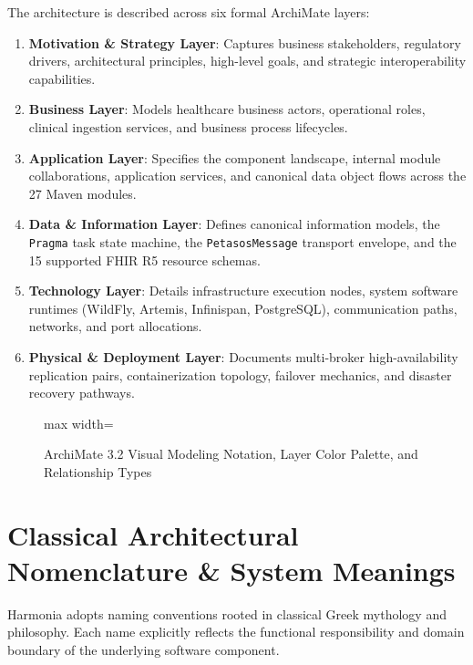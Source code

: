 The architecture is described across six formal ArchiMate layers:
\begin{enumerate}
    \item \textbf{Motivation \& Strategy Layer}: Captures business stakeholders, regulatory drivers, architectural principles, high-level goals, and strategic interoperability capabilities.
    \item \textbf{Business Layer}: Models healthcare business actors, operational roles, clinical ingestion services, and business process lifecycles.
    \item \textbf{Application Layer}: Specifies the component landscape, internal module collaborations, application services, and canonical data object flows across the 27 Maven modules.
    \item \textbf{Data \& Information Layer}: Defines canonical information models, the \texttt{Pragma} task state machine, the \texttt{PetasosMessage} transport envelope, and the 15 supported FHIR R5 resource schemas.
    \item \textbf{Technology Layer}: Details infrastructure execution nodes, system software runtimes (WildFly, Artemis, Infinispan, PostgreSQL), communication paths, networks, and port allocations.
    \item \textbf{Physical \& Deployment Layer}: Documents multi-broker high-availability replication pairs, containerization topology, failover mechanics, and disaster recovery pathways.
\end{enumerate}

\begin{figure}[htbp]
    \centering
    \begin{adjustbox}{max width=\textwidth}
        
    \end{adjustbox}
    \caption{ArchiMate 3.2 Visual Modeling Notation, Layer Color Palette, and Relationship Types}
    \label{fig:archimate_legend}
\end{figure}

\section*{Classical Architectural Nomenclature \& System Meanings}

Harmonia adopts naming conventions rooted in classical Greek mythology and philosophy. Each name explicitly reflects the functional responsibility and domain boundary of the underlying software component.

